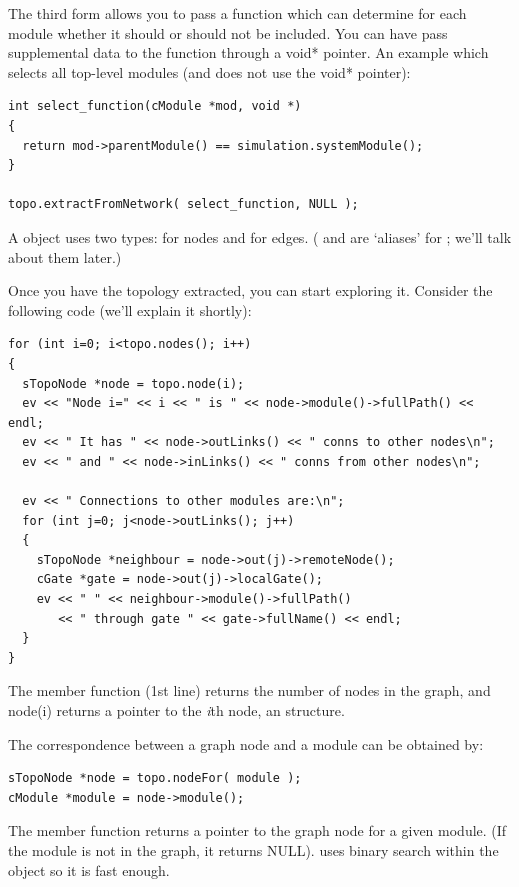 The third form allows you to pass a function which can determine for
each module whether it should or should not be included.  You can have
 pass supplemental data to the function through a
void* pointer. An example which selects all top-level modules (and
does not use the void* pointer):

\begin{verbatim}
int select_function(cModule *mod, void *)
{
  return mod->parentModule() == simulation.systemModule();
}

topo.extractFromNetwork( select_function, NULL );
\end{verbatim}

%
%

A  object uses two types:  for
nodes and  for edges. ( and
 are `aliases' for ; we'll
talk about them later.)

Once you have the topology extracted, you can start exploring
it. Consider the following code (we'll explain it shortly):

\begin{verbatim}
for (int i=0; i<topo.nodes(); i++)
{
  sTopoNode *node = topo.node(i);
  ev << "Node i=" << i << " is " << node->module()->fullPath() << endl;
  ev << " It has " << node->outLinks() << " conns to other nodes\n";
  ev << " and " << node->inLinks() << " conns from other nodes\n";

  ev << " Connections to other modules are:\n";
  for (int j=0; j<node->outLinks(); j++)
  {
    sTopoNode *neighbour = node->out(j)->remoteNode();
    cGate *gate = node->out(j)->localGate();
    ev << " " << neighbour->module()->fullPath()
       << " through gate " << gate->fullName() << endl;
  }
}
\end{verbatim}

The  member function (1st line) returns the number of
nodes in the graph, and node(i) returns a pointer to the \textit{i}th
node, an  structure.


The correspondence between a graph node and a module can be obtained
by:

\begin{verbatim}
sTopoNode *node = topo.nodeFor( module );
cModule *module = node->module();
\end{verbatim}


The  member function returns a pointer to the graph
node for a given module. (If the module is not in the graph, it
returns NULL).  uses binary search within the
 object so it is fast enough.


